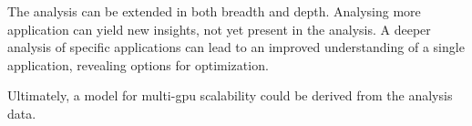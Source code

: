 The analysis can be extended in both breadth and depth. Analysing more application can yield new insights, not yet present
in the analysis. A deeper analysis of specific applications can lead to an improved understanding of a single application,
revealing options for optimization.

Ultimately, a model for multi-gpu scalability could be derived from the analysis data.